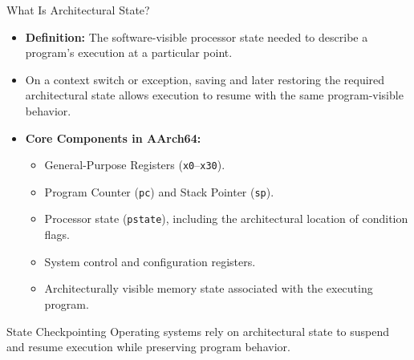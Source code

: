 \documentclass[aspectratio=169,11pt,t,xcolor=table]{beamer}
\newcommand{\key}[1]{\textbf{#1}}
\newcommand{\bits}[1]{\texttt{#1}}
\begin{document}

\begin{frame}{What Is Architectural State?}
\begin{itemize}\setlength{\itemsep}{3pt}
  \item \key{Definition:} The software-visible processor state needed to describe a program's execution at a particular point.
  \item On a context switch or exception, saving and later restoring the required architectural state allows execution to resume with the same program-visible behavior.
  \item \key{Core Components in AArch64:}
  \begin{itemize}\setlength{\itemsep}{2pt}
    \item General-Purpose Registers (\bits{x0}--\bits{x30}).
    \item Program Counter (\bits{pc}) and Stack Pointer (\bits{sp}).
    \item Processor state (\bits{pstate}), including the architectural location of condition flags.
    \item System control and configuration registers.
    \item Architecturally visible memory state associated with the executing program.
  \end{itemize}
\end{itemize}

\vfill
\begin{block}{State Checkpointing}
\small Operating systems rely on architectural state to suspend and resume execution while preserving program behavior.
\end{block}
\end{frame}









\end{document}
